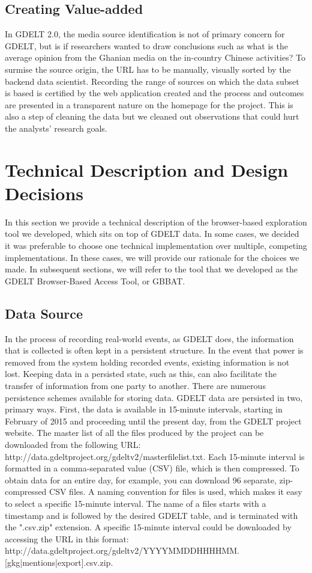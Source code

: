 \documentclass[preprint,authoryear,12pt]{elsarticle/elsarticle}
\begin{document}
\subsection{Creating Value-added}
In GDELT 2.0, the media source identification is not of primary concern for GDELT, but is if researchers wanted to draw conclusions such as what is the average opinion from the Ghanian media on the in-country Chinese activities? To surmise the source origin, the URL has to be manually, visually sorted by the backend data scientist. Recording the range of sources on which the data subset is based is certified by the web application created and the process and outcomes are presented in a transparent nature on the homepage for the project. This is also a step of cleaning the data but we cleaned out observations that could hurt the analysts’ research goals.


\section{Technical Description and Design Decisions}
In this section we provide a technical description of the browser-based exploration tool we developed, which sits on top of GDELT data. In some cases, we decided it was preferable to choose one technical implementation over multiple, competing implementations. In these cases, we will provide our rationale for the choices we made.
In subsequent sections, we will refer to the tool that we developed as the GDELT Browser-Based Access Tool, or GBBAT.

\subsection{Data Source}
In the process of recording real-world events, as GDELT does, the information that is collected is often kept in a persistent structure. In the event that power is removed from the system holding recorded events, existing information is not lost. Keeping data in a persisted state, such as this, can also facilitate the transfer of information from one party to another. There are numerous persistence schemes available for storing data. GDELT data are persisted in two, primary ways.  First, the data is available in 15-minute intervals, starting in February of 2015 and proceeding until the present day, from the GDELT project website. The master list of all the files produced by the project can be downloaded from the following URL: http://data.gdeltproject.org/gdeltv2/masterfilelist.txt. Each 15-minute interval is formatted in a comma-separated value (CSV) file, which is then compressed. To obtain data for an entire day, for example, you can download 96 separate, zip-compressed CSV files. A naming convention for files is used, which makes it easy to select a specific 15-minute interval. The name of a files starts with a timestamp and is followed by the desired GDELT table, and is terminated with the ".csv.zip" extension. A specific 15-minute interval could be downloaded by accessing the URL in this format: http://data.gdeltproject.org/gdeltv2/YYYYMMDDHHHHMM.[gkg|mentions|export].csv.zip.
\end{document}
